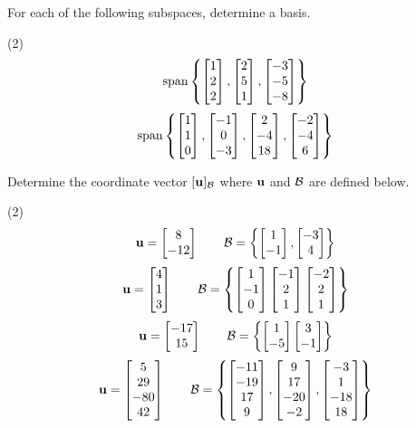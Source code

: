 For each of the following subspaces, determine a basis.
\begin{tasks}[resume, style=enumerate](2)
\task
  \begin{align*}
    \operatorname{\mathrm{span}}
    \left
    \{\begin{bmatrix} 1 \\ 2 \\ 2 \end{bmatrix},
    \begin{bmatrix} 2 \\ 5 \\ 1 \end{bmatrix},
    \begin{bmatrix} -3 \\ -5 \\ -8 \end{bmatrix}
    \right\}
  \end{align*}
\task
  \begin{align*}
    \operatorname{\mathrm{span}} \left\{
    \begin{bmatrix} 1 \\ 1 \\ 0 \end{bmatrix},
    \begin{bmatrix} -1 \\ 0 \\ -3 \end{bmatrix},
    \begin{bmatrix} 2 \\ -4 \\ 18 \end{bmatrix},
    \begin{bmatrix} -2 \\ -4 \\ 6 \end{bmatrix}
    \right\}
\end{align*}
\end{tasks}
Determine the coordinate vector $[\mathbf u]_{\mathcal B}$ where
$\mathbf u$ and $\mathcal B$ are defined below.
\begin{tasks}[resume, style=enumerate](2)
\task
  \begin{displaymath}
    \mathbf u =  \begin{bmatrix} 8 \\ -12 \end{bmatrix} 
    \qquad
    \mathcal B = \left\{  \begin{bmatrix} 1 \\ -1 \end{bmatrix} ,  \begin{bmatrix} -3 \\ 4 \end{bmatrix}  \right\}
  \end{displaymath}
\task
  \begin{displaymath}
    \mathbf u =  \begin{bmatrix} 4 \\ 1 \\ 3 \end{bmatrix} 
    \qquad
    \mathcal B = \left\{
     \begin{bmatrix} 1 \\ -1 \\ 0 \end{bmatrix} 
     \begin{bmatrix} -1 \\ 2 \\ 1 \end{bmatrix} 
     \begin{bmatrix} -2 \\ 2 \\ 1 \end{bmatrix} 
    \right\}
  \end{displaymath}
\task
  \begin{displaymath}
    \mathbf u =  \begin{bmatrix} -17 \\ 15 \end{bmatrix} 
    \qquad
    \mathcal B =
    \left\{
     \begin{bmatrix} 1 \\ -5 \end{bmatrix} 
     \begin{bmatrix} 3 \\ -1 \end{bmatrix} 
    \right\}
  \end{displaymath}
\task \faCalculator
  \begin{displaymath}
    \mathbf u =  \begin{bmatrix} 5 \\ 29 \\ -80 \\ 42 \end{bmatrix} 
    \qquad
    \mathcal B =
    \left\{
     \begin{bmatrix} -11 \\ -19 \\ 17 \\ 9 \end{bmatrix} ,
     \begin{bmatrix} 9 \\ 17 \\ -20 \\ -2 \end{bmatrix} ,
     \begin{bmatrix} -3 \\ 1 \\ -18 \\ 18 \end{bmatrix} 
    \right\}
  \end{displaymath}
\end{tasks}
